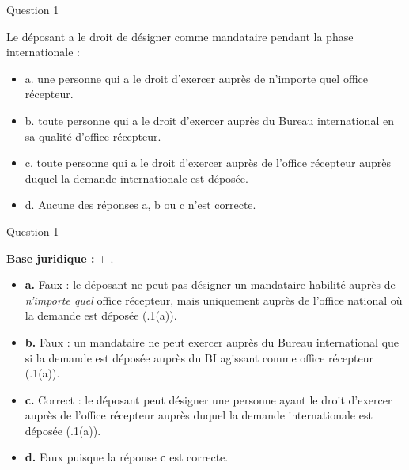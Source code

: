 \begin{frame}{Question 1}

\begin{block}{}
Le déposant a le droit de désigner comme mandataire pendant la phase
internationale :

\begin{itemize}
  \item[$\circ$] a. une personne qui a le droit d’exercer auprès de n’importe quel office récepteur.
  \item[$\circ$] b. toute personne qui a le droit d’exercer auprès du Bureau international en sa qualité
  d’office récepteur.
  \item[$\bullet$] c. toute personne qui a le droit d’exercer auprès de l’office récepteur auprès duquel la
  demande internationale est déposée.
  \item[$\circ$] d. Aucune des réponses a, b ou c n’est correcte.
\end{itemize}

\end{block}

\end{frame}

\begin{frame}{Question 1}

\textbf{Base juridique :}  + .  

\begin{itemize}
  \item[$\circ$] \textbf{a.} \; Faux : le déposant ne peut pas désigner un mandataire habilité
  auprès de \emph{n’importe quel} office récepteur, mais uniquement auprès de l’office national
  où la demande est déposée (.1(a)).

  \item[$\circ$] \textbf{b.} \; Faux : un mandataire ne peut exercer auprès du Bureau international
  que si la demande est déposée auprès du BI agissant comme office récepteur (.1(a)).

  \item[$\bullet$] \textbf{c.} \; Correct : le déposant peut désigner une personne ayant le droit
  d’exercer auprès de l’office récepteur auprès duquel la demande internationale est déposée
  (.1(a)).

  \item[$\circ$] \textbf{d.} \; Faux puisque la réponse \textbf{c} est correcte.
\end{itemize}

\end{frame}